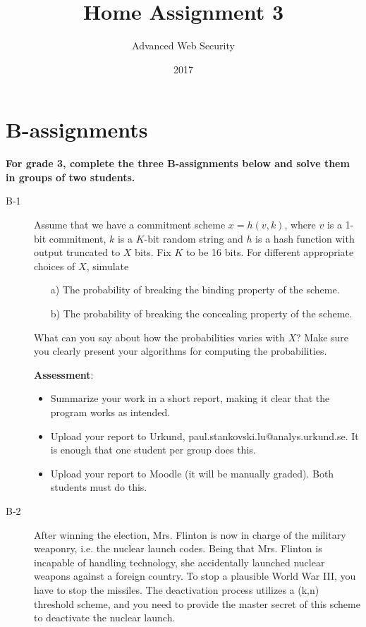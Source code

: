 \documentclass{article}
\begin{document}
	
\title{Home Assignment 3}
\author{Advanced Web Security}
\date{2017}

\maketitle

\section*{B-assignments}
\textbf{For grade 3, complete the three B-assignments below and solve them in groups of two students.}

\begin{description}
	\item[B-1]{Assume that we have a commitment scheme $x = h(v, k)$, where $v$ is a 1-bit commitment,
		$k$ is a $K$-bit random string and $h$ is a hash function with output truncated to $X$ bits.
		Fix $K$ to be 16 bits. For different appropriate choices of $X$, simulate
		\begin{itemize}
			\item[a)] The probability of breaking the binding property of the scheme.
			\item[b)] The probability of breaking the concealing property of the scheme.
		\end{itemize}
		What can you say about how the probabilities varies with $X$? Make sure you clearly present
		your algorithms for computing the probabilities.
		
		\textbf{Assessment}:
		\begin{itemize}
			\item Summarize your work in a short report, making it clear that the program works as intended.
			
			\item Upload your report to Urkund, paul.stankovski.lu@analys.urkund.se. 
			It is enough that one student per group does this.
			
			\item Upload your report to Moodle (it will be manually graded). Both students must do this.
		\end{itemize}}
		
		
		\item[B-2]{After winning the election, Mrs. Flinton is now in charge of the military
			weaponry, i.e. the nuclear launch codes. Being that Mrs. Flinton is incapable of handling
			technology, she accidentally launched nuclear weapons against a foreign country.
			To stop a plausible World War III, you have to stop the missiles. The deactivation process
			utilizes a (k,n) threshold scheme, and you need to provide the master secret of this scheme
			to deactivate the nuclear launch.
			
}
\end{description}
\end{document}
